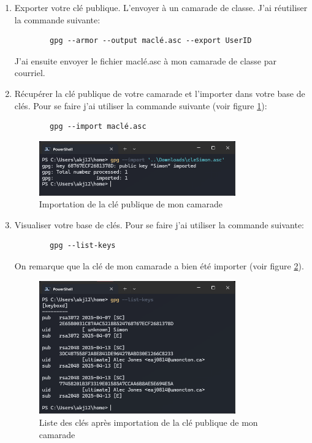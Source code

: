 \documentclass[12pt,a4paper]{article}
\begin{document}
\begin{enumerate}[label=\Roman*]
    \item Exporter votre clé publique. L'envoyer à un camarade de classe. J'ai réutiliser la commande suivante:
          \begin{verbatim}
        gpg --armor --output maclé.asc --export UserID
    \end{verbatim}
          J'ai ensuite envoyer le fichier maclé.asc à mon camarade de classe par courriel.

    \item Récupérer la clé publique de votre camarade et l'importer dans votre base de clés.
          Pour se faire j'ai utiliser la commande suivante (voir figure \ref{import}):
          \begin{verbatim}
        gpg --import maclé.asc
    \end{verbatim}

          \begin{figure}[ht]
              \centering
              \includegraphics[width=0.8\textwidth]{../img/importCle.png}
              \caption{Importation de la clé publique de mon camarade}
              \label{import}
          \end{figure}


    \item Visualiser votre base de clés.
          Pour se faire j'ai utiliser la commande suivante:
          \begin{verbatim}
        gpg --list-keys
    \end{verbatim}
          On remarque que la clé de mon camarade a bien été importer (voir figure \ref{listKeysSimon}).

          \begin{figure}[ht]
              \centering
              \includegraphics[width=0.8\textwidth]{../img/listKeysSimon.png}
              \caption{Liste des clés après importation de la clé publique de mon camarade}
              \label{listKeysSimon}
          \end{figure}


\end{enumerate}
\end{document}
